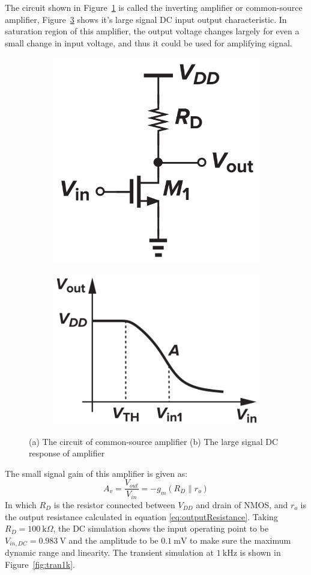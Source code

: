 \documentclass[12pt]{article}   %
\begin{document}
	The circuit shown in Figure~\ref{fig:invAmp} is called the inverting amplifier or common-source amplifier, Figure~\ref{fig:dcResponse} shows it's large signal DC input output characteristic. In saturation region of this amplifier, the output voltage changes largely for even a small change in input voltage, and thus it could be used for amplifying signal.
	\begin{figure}[htbp]
		\centering
		\begin{subfigure}[c]{0.48\linewidth}
			\centering
			\includegraphics[width=0.5\linewidth]{Figures/E2_Inverting_Amplifier/Inv_amp}
			\caption{}
			\label{fig:invAmp}
		\end{subfigure}
		\begin{subfigure}[c]{0.48\linewidth}
			\centering
			\includegraphics[width=0.7\linewidth]{Figures/E2_Inverting_Amplifier/DC_response}
			\caption{}
			\label{fig:dcResponse}
		\end{subfigure}
		\caption{(a) The circuit of common-source amplifier (b) The large signal DC response of amplifier\cite{razaviDesignAnalogCMOS2017}}
	\end{figure}
	
	The small signal gain of this amplifier is given as\cite{razaviDesignAnalogCMOS2017}:
	\begin{equation}
		A_v = \frac{V_{out}}{V_{in}} = -g_m \left(R_D \parallel r_o\right)
		\label{eq:invAmpGain}
	\end{equation}
	In which $R_{D}$ is the resistor connected between $V_{DD}$ and drain of NMOS, and $r_o$ is the output resistance calculated in equation \eqref{eq:outputResistance}. Taking $R_D = \SI{100}{\kilo\Omega}$, the DC simulation shows the input operating point to be $V_{in,DC} = \SI{0.983}{\volt}$ and the amplitude to be $\SI{0.1}{\milli\volt}$ to make sure the maximum dynamic range and linearity. The transient simulation at $\SI{1}{\kilo\hertz}$ is shown in Figure~\ref{fig:tran1k}.
	
\end{document}

